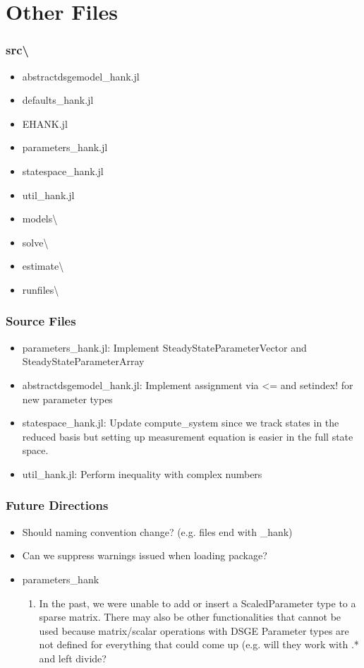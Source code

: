 \documentclass{beamer}
\begin{document}
\section{Other Files}

\begin{frame}
\frametitle{src\textbackslash}
\begin{itemize}
  \item abstractdsgemodel\_hank.jl
  \item defaults\_hank.jl
  \item EHANK.jl
  \item parameters\_hank.jl
  \item statespace\_hank.jl
  \item util\_hank.jl
  \item models\textbackslash
  \item solve\textbackslash
  \item estimate\textbackslash
  \item runfiles\textbackslash
\end{itemize}
\end{frame}

\begin{frame}
\frametitle{Source Files}
\begin{itemize}
\item parameters\_hank.jl: Implement SteadyStateParameterVector and SteadyStateParameterArray
\item abstractdsgemodel\_hank.jl: Implement assignment via <= and setindex! for new parameter types
\item statespace\_hank.jl: Update compute\_system since we track states in the reduced basis but setting up measurement equation is easier in the full state space.
\item util\_hank.jl: Perform inequality with complex numbers
\end{itemize}
\end{frame}

\begin{frame}
  \frametitle{Future Directions}
\begin{itemize}
\item Should naming convention change? (e.g. files end with \_hank)
\item Can we suppress warnings issued when loading package?
\item parameters\_hank
  \begin{enumerate}
  \item In the past, we were unable to add or insert a ScaledParameter type to a sparse matrix. There may also be other functionalities that cannot be used because matrix/scalar operations with DSGE Parameter types are not defined for everything that could come up (e.g. will they work with .* and left divide?
  \end{enumerate}
\end{itemize}
\end{frame}
\end{document}
